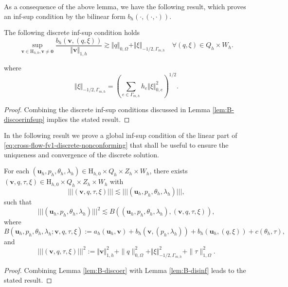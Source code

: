 \documentclass[onefignum,onetabnum,reqno,a4paper,final]{siamart250211}
\newcommand\bu{\boldsymbol{u}}
\newcommand\bv{\boldsymbol{v}}
\newcommand\0{\mathbf{0}}
\newcommand\bH{\boldsymbol{\mathrm{H}}}
\newcommand{\triplenorm}[1]{\lvert\!\lvert\!\lvert #1
  \rvert\!\rvert\!\rvert}
\numberwithin{figure}{section}
\numberwithin{table}{section}
\begin{document}
         As a consequence of the above lemma, we have the following result, which proves %
         an inf-sup 
         condition by the bilinear form $b_h(\cdot,(\cdot,\cdot))$.
     	\begin{lemma}\label{lem:B-disinf}
		The following discrete inf-sup condition holds 
		\[
		\sup_{\bv\in {\bH_{h,0}},\bv\neq\boldsymbol{0}} \frac{
			b_h(\bv,(q,\xi)) }
         {\Vert\bv\Vert_{1,h}}
        \gtrsim 
        \Vert q\Vert_{0,\Omega}
        +\Vert \xi \Vert_{-1/2,{\Gamma_{m,h}}} 
        \quad \forall (q,\xi)\in Q_{h}\times W_{h}. %
		\]
	\end{lemma}
 where 
    \[\Vert \xi\Vert_{-1/2,\Gamma_{m,h}}= (\sum_{e\in\Gamma_{m,h}}h_e\Vert \xi\Vert_{0,e}^2)^{1/2}.\]
	\begin{proof}
    Combining the discrete inf-sup conditions discussed in Lemma \ref{lem:B-discoerinfsup}    implies the stated result. 
    \end{proof}
    In the following result we prove a global inf-sup condition of the linear part of \eqref{eq:cross-flow-fv1-discrete-nonconforming} that shall be useful to ensure the uniqueness and convergence of the discrete solution.
    \begin{lemma}\label{lem:stab-div-11}
    For each $(\bu_h,p_h,\theta_h,\lambda_h)\in {\bH_{h,0}}\times Q_h\times Z_h\times W_h$, there exists $(\bv,q,\tau,\xi)\in {\bH_{h,0}}\times Q_h\times Z_h\times W_h$ with 
    \[\triplenorm{(\bv,q,\tau,\xi)}\lesssim \triplenorm{(\bu_h,p_h,\theta_h,\lambda_h)},\]
    such that 
    \[
     \triplenorm{(\bu_h,p_h,\theta_h,\lambda_h)}^2\lesssim B((\bu_h,p_h,\theta_h,\lambda_h),(\bv,q,\tau,\xi)),   
    \]
    where 
    \[{B(\bu_h,p_h,\theta_h,\lambda_h; \bv,q,\tau,\xi):=a_h(\bu_h,\bv)+b_h(\bv,(p_h,\lambda_h))+b_h(\bu_h,(q,\xi))+c(\theta_h,\tau),}\]
    and
    \[
       \triplenorm{(\bv,q,\tau,\xi)}^2:= \Vert\bv\Vert_{1,h}^2+\|q\|_{0,\Omega}^2+\Vert \xi\Vert_{-1/2,\Gamma_{m,h}}^2+\|\tau\|_{1,\Omega}^2.
    \]
\end{lemma}
\begin{proof}
 Combining Lemma \ref{lem:B-discoer} with Lemma \ref{lem:B-disinf} leads to the stated result. 
\end{proof}
\end{document}
